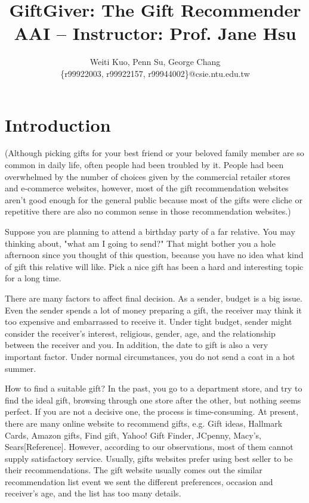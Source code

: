 \documentclass[11pt,twocolumn]{article}
\title{GiftGiver: The Gift Recommender \\ {\small AAI --
    Instructor: Prof. Jane Hsu}}
\author{Weiti Kuo, Penn Su, George Chang \\ \{r99922003, r99922157, r99944002\}@csie.ntu.edu.tw}
\begin{document}
\maketitle

\section{Introduction}

(Although picking gifts for your best friend or your beloved family member are so common in daily life, often people had been troubled by it. People had been overwhelmed by the number of choices given by the commercial retailer stores and e-commerce websites, however, most of the gift recommendation websites aren't good enough for the general public because most of the gifts were cliche or repetitive there are also no common sense in those recommendation websites.)

Suppose you are planning to attend a birthday party of a far relative.  You may thinking about, "what am I going to send?"  That might bother you a hole afternoon since you thought of this question, because you have no idea what kind of gift this relative will like.  Pick a nice gift has been a hard and interesting topic for a long time.   

There are many factors to affect final decision. As a sender, budget is a big issue. Even the sender spends a lot of money preparing a gift, the receiver may think it too expensive and embarrassed to receive it.   Under tight budget, sender might consider the receiver's interest, religious, gender, age, and the relationship between the receiver and you. In addition, the date to gift is also a very important factor. Under normal circumstances, you do not send a coat in a hot summer.

How to find a suitable gift? In the past, you go to a department store, and try to find the ideal gift, browsing through one store after the other, but nothing seems perfect. If you are not a decisive one, the process is time-consuming. At present, there are many online website to recommend gifts, e.g. Gift ideas, Hallmark Cards, Amazon gifts, Find gift, Yahoo! Gift Finder, JCpenny, Macy's, Sears[Reference]. However, according to our observations, most of them cannot supply satisfactory service. Usually, gifts websites prefer using best seller to be their recommendations. The gift website usually comes out the similar recommendation list event we sent the different preferences, occasion and receiver’s age, and the list has too many details.
\end{document}
